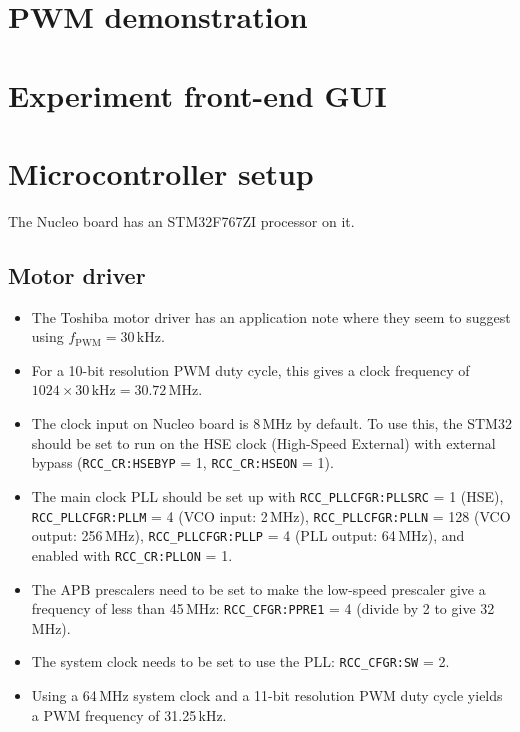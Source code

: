 \documentclass[a4paper,11pt]{article}
\begin{document}
\section{PWM demonstration}


\section{Experiment front-end GUI}


\section{Microcontroller setup}

The Nucleo board has an STM32F767ZI processor on it.

\subsection{Motor driver}

\begin{itemize}
  \item{The Toshiba motor driver has an application note where they
    seem to suggest using $f_{\mathrm{PWM}} = 30\,\mathrm{kHz}$.}
  \item{For a 10-bit resolution PWM duty cycle, this gives a clock
    frequency of $1024 \times 30\,\mathrm{kHz} = 30.72\,\mathrm{MHz}$.}
  \item{The clock input on Nucleo board is 8\,MHz by default. To use
    this, the STM32 should be set to run on the HSE clock (High-Speed
    External) with external bypass (\texttt{RCC\_CR:HSEBYP} = 1,
    \texttt{RCC\_CR:HSEON} = 1).}
  \item{The main clock PLL should be set up with
    \texttt{RCC\_PLLCFGR:PLLSRC} = 1 (HSE), \texttt{RCC\_PLLCFGR:PLLM}
    = 4 (VCO input: 2\,MHz), \texttt{RCC\_PLLCFGR:PLLN} = 128 (VCO
    output: 256\,MHz), \texttt{RCC\_PLLCFGR:PLLP} = 4 (PLL output:
    64\,MHz), and enabled with \texttt{RCC\_CR:PLLON} = 1.}
  \item{The APB prescalers need to be set to make the low-speed
    prescaler give a frequency of less than 45\,MHz:
    \texttt{RCC\_CFGR:PPRE1} = 4 (divide by 2 to give 32\,MHz).}
  \item{The system clock needs to be set to use the PLL:
    \texttt{RCC\_CFGR:SW} = 2.}
  \item{Using a 64\,MHz system clock and a 11-bit resolution PWM duty
    cycle yields a PWM frequency of 31.25\,kHz.}
\end{itemize}
\end{document}

